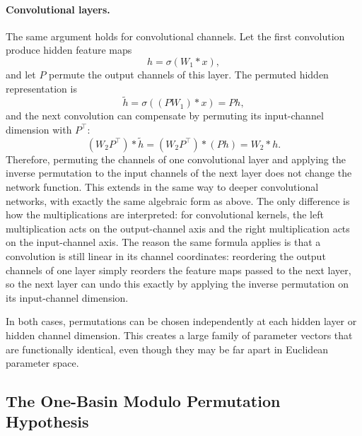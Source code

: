 \documentclass[11pt,a4paper]{report}
\begin{document}
\paragraph{Convolutional layers.}
The same argument holds for convolutional channels. Let the first convolution produce hidden feature maps
\[
h = \sigma(W_1 * x),
\]
and let $P$ permute the output channels of this layer. The permuted hidden representation is
\[
\widetilde{h} = \sigma((P W_1) * x) = P h,
\]
and the next convolution can compensate by permuting its input-channel dimension with $P^\top$:
\[
(W_2 P^\top) * \widetilde{h}
=
(W_2 P^\top) * (P h)
=
W_2 * h.
\]
Therefore, permuting the channels of one convolutional layer and applying the inverse permutation to the input channels of the next layer does not change the network function. This extends in the same way to deeper convolutional networks, with exactly the same algebraic form as above. The only difference is how the multiplications are interpreted: for convolutional kernels, the left multiplication acts on the output-channel axis and the right multiplication acts on the input-channel axis. The reason the same formula applies is that a convolution is still linear in its channel coordinates: reordering the output channels of one layer simply reorders the feature maps passed to the next layer, so the next layer can undo this exactly by applying the inverse permutation on its input-channel dimension.

In both cases, permutations can be chosen independently at each hidden layer or hidden channel dimension. This creates a large family of parameter vectors that are functionally identical, even though they may be far apart in Euclidean parameter space.

\subsection{The One-Basin Modulo Permutation Hypothesis}
\end{document}
